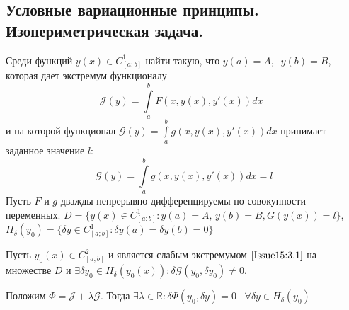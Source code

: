 \subsection{Условные вариационные принципы. Изопериметрическая задача.}
Среди функций $y(x)\in C^1_{[a;b]}$ найти такую, что $y(a)=A,\;\; y(b)=B$, которая дает экстремум функционалу 
\begin{equation}
	\mathcal{J}(y)=\int\limits_a^b F(x,y(x),y'(x))dx\;\;
	\label{Issue15:3.1}
\end{equation} 
и на которой функционал $\mathcal{G}(y) = \int\limits_a^b g(x,y(x),y'(x))dx$ принимает заданное значение $l$:
\begin{equation}
	\label{Issue15:3.2}
	\mathcal{G}(y)=\int\limits_a^b g(x,y(x),y'(x))d x=l
\end{equation}
Пусть $F$ и $g$ дважды непрерывно дифференцируемы по совокупности переменных. $D=\{y(x)\in C^1_{[a;b]}:y(a)=A, \, y(b)=B, G(y(x))=l\}$, 
$H_\delta (y_0)=\{\delta y \in C^1_{[a;b]}:\delta y (a) = \delta  y(b)=0\}$
\begin{theorem}
	Пусть $y_0(x)\in C^2_{[a;b]}$ и является слабым экстремумом $\eqref{Issue15:3.1}$ на множестве $D$ и $\exists \delta y_0\in H_\delta (y_0(x)): \delta \mathcal{G}(y_0,\delta y_0)\neq 0.$
	
	Положим $\Phi =\mathcal{J}+\lambda\mathcal{G}.$ Тогда $\exists \lambda \in \mathds{R}: \delta \Phi(y_0,\delta y)=0\;\;\;\forall \delta y\in H_\delta(y_0)$
\end{theorem}
